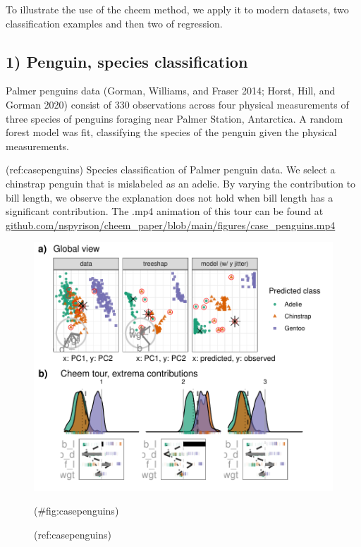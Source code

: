 \documentclass[
]{article}
\begin{document}
To illustrate the use of the cheem method, we apply it to modern
datasets, two classification examples and then two of regression.

\hypertarget{penguin-species-classification}{%
\subsection{1) Penguin, species
classification}\label{penguin-species-classification}}

Palmer penguins data (Gorman, Williams, and Fraser 2014; Horst, Hill,
and Gorman 2020) consist of 330 observations across four physical
measurements of three species of penguins foraging near Palmer Station,
Antarctica. A random forest model was fit, classifying the species of
the penguin given the physical measurements.

(ref:casepenguins) Species classification of Palmer penguin data. We
select a chinstrap penguin that is mislabeled as an adelie. By varying
the contribution to bill length, we observe the explanation does not
hold when bill length has a significant contribution. The .mp4 animation
of this tour can be found at
\href{https://github.com/nspyrison/cheem_paper/blob/main/figures/case_penguins.mp4}{github.com/nspyrison/cheem\_paper/blob/main/figures/case\_penguins.mp4}

\begin{figure}

{\centering \includegraphics[width=1\linewidth]{./figures/case_penguins} 

}

\caption{(ref:casepenguins)}(\#fig:casepenguins)
\end{figure}
\end{document}
